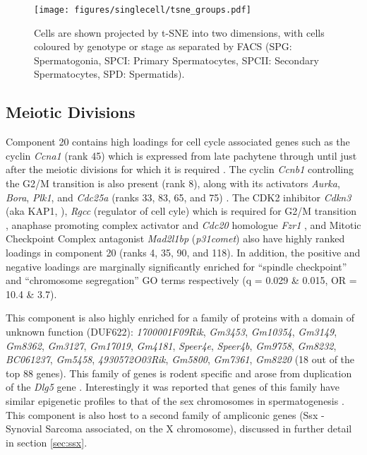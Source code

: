 \begin{figure}[H]
	\centering
	\texttt{[image: figures/singlecell/tsne\_groups.pdf]}
	\caption[Experimental groups in t-SNE space]{
		Cells are shown projected by t-SNE into two dimensions, with cells coloured by genotype or stage as separated by FACS (SPG: Spermatogonia, SPCI: Primary Spermatocytes, SPCII: Secondary Spermatocytes, SPD: Spermatids).
	}
	\label{fig:tsneGroups}
\end{figure}



\subsection{Meiotic Divisions}
Component 20 contains high loadings for cell cycle associated genes such as the cyclin \textit{Ccna1} (rank 45) which is expressed from late pachytene through until just after the meiotic divisions \parencite{Sweeney1996distinct} for which it is required \parencite{Liu1998Cyclin}.
The cyclin \textit{Ccnb1} controlling the G2/M transition is also present (rank 8), along with its activators \textit{Aurka}, \textit{Bora}, \textit{Plk1}, and \textit{Cdc25a} (ranks 33, 83, 65, and 75) \parencite[reviewed in][]{Joukov2018AuroraPLK1}.
The CDK2 inhibitor \textit{Cdkn3} (aka KAP1, \parencite{Poon1995Dephosphorylation}), \textit{Rgcc} (regulator of cell cyle) which is required for G2/M transition \parencite{Saigusa2007RGC32}, anaphase promoting complex activator and \textit{Cdc20} homologue \textit{Fzr1} \parencite{Holt2014APC}, and Mitotic Checkpoint Complex antagonist \textit{Mad2l1bp} (\textit{p31comet}) \parencite{Habu2002Identification} also have highly ranked loadings in component 20 (ranks 4, 35, 90, and 118).
In addition, the positive and negative loadings are marginally significantly enriched for ``spindle checkpoint'' and ``chromosome segregation'' GO terms respectively (q = 0.029 \& 0.015, OR = 10.4 \& 3.7).

This component is also highly enriched for a family of proteins with a domain of unknown function (DUF622): \textit{1700001F09Rik}, \textit{Gm3453}, \textit{Gm10354}, \textit{Gm3149}, \textit{Gm8362}, \textit{Gm3127}, \textit{Gm17019}, \textit{Gm4181}, \textit{Speer4e}, \textit{Speer4b}, \textit{Gm9758}, \textit{Gm8232}, \textit{BC061237}, \textit{Gm5458}, \textit{4930572O03Rik}, \textit{Gm5800}, \textit{Gm7361}, \textit{Gm8220} (18 out of the top 88 genes).
This family of genes is rodent specific and arose from duplication of the \textit{Dlg5} gene \parencite{Church2009Lineagespecific}.
Interestingly it was reported that genes of this family have similar epigenetic profiles to that of the sex chromosomes in spermatogenesis \parencite{Moretti2016Expression}.
This component is also host to a second family of ampliconic genes (Ssx - Synovial Sarcoma associated, on the X chromosome), discussed in further detail in section \ref{sec:ssx}.

